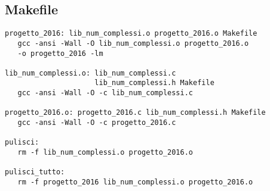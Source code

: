 \documentclass[a4paper,10pt]{article}
\begin{document}
\subsection*{Makefile}					%
\begin{verbatim}
progetto_2016: lib_num_complessi.o progetto_2016.o Makefile
   gcc -ansi -Wall -O lib_num_complessi.o progetto_2016.o
   -o progetto_2016 -lm

lib_num_complessi.o: lib_num_complessi.c 
                     lib_num_complessi.h Makefile
   gcc -ansi -Wall -O -c lib_num_complessi.c

progetto_2016.o: progetto_2016.c lib_num_complessi.h Makefile
   gcc -ansi -Wall -O -c progetto_2016.c

pulisci:
   rm -f lib_num_complessi.o progetto_2016.o

pulisci_tutto:
   rm -f progetto_2016 lib_num_complessi.o progetto_2016.o
\end{verbatim}						%
\end{document}
